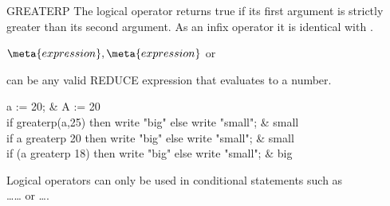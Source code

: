 \begin{Operator}{GREATERP}
The  logical operator returns true if its first argument is
strictly greater than its second argument.  As an infix operator it is
identical with \name{>}.
\begin{Syntax}
\(\meta{expression},\meta{expression}\) or 
 
\end{Syntax}

 can be any valid REDUCE expression that evaluates to a
number.

\begin{Examples}

a := 20;                     &          A := 20 \\
if greaterp(a,25) then write "big" else write "small";
			     &          small \\
if a greaterp 20 then write "big" else write "small";
			     &          small \\
if (a greaterp 18) then write "big" else write "small";
			     &          big
\end{Examples}

\begin{Comments}
Logical operators can only be used in conditional statements such as \\
\ldots{}\ldots{} 
or \ldots{}.
\end{Comments}
\end{Operator}


